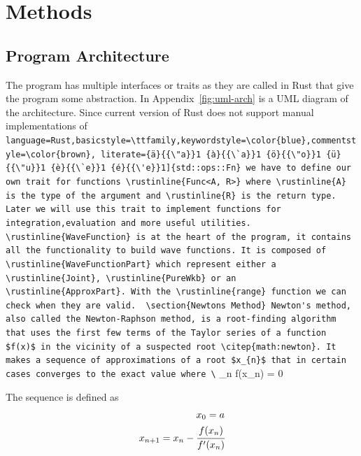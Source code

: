 \documentclass[11pt,DIV=10,final]{scrreprt} %
\providecommand{\rustinline}{\lstinline[language=Rust,basicstyle=\ttfamily,keywordstyle=\color{blue},commentstyle=\color{brown}, literate={ä}{{\"a}}1 {à}{{\`a}}1 {ö}{{\"o}}1 {ü}{{\"u}}1 {è}{{\`e}}1 {é}{{\'e}}1]} % für Inline-C++ Code
\begin{document}
\chapter{Methods}
\section{Program Architecture}
The program has multiple interfaces or traits as they are called in Rust that give the program some abstraction.
In Appendix~\ref{fig:uml-arch} is a UML diagram of the architecture.
Since current version of Rust does not support manual implementations of \rustinline{std::ops::Fn} we have to define our own trait for functions \rustinline{Func<A, R>} where \rustinline{A} is the type of the argument and \rustinline{R} is the return type. Later we will use this trait to implement functions for integration,evaluation and more useful utilities.

\rustinline{WaveFunction} is at the heart of the program, it contains all the functionality to build wave functions. It is composed of \rustinline{WaveFunctionPart} which represent either a \rustinline{Joint}, \rustinline{PureWkb} or an \rustinline{ApproxPart}. With the \rustinline{range} function we can check when they are valid.

\section{Newtons Method}
Newton's method, also called the Newton-Raphson method, is a root-finding algorithm that uses the first few terms of the Taylor series of a function $f(x)$ in the vicinity of a suspected root
\citep{math:newton}. It makes a sequence of approximations of a root $x_{n}$ that in certain cases converges to the exact value where
\[
  \lim _{n \to \infty}f(x_{n}) = 0
\]

The sequence is defined as
\begin{align*}
  x_{0}=a \\*
  x_{n+1}=x_{n}-\cfrac{f(x_{n})}{f'(x_{n})}
\end{align*}
\end{document}
